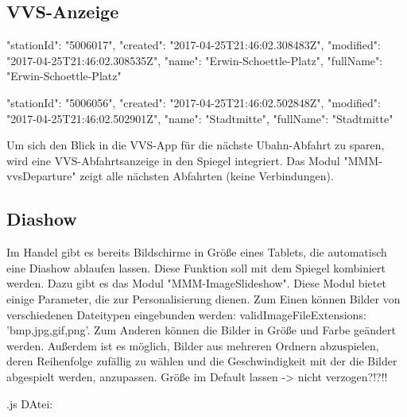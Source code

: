 \documentclass[12pt,a4paper]{report}
\begin{document}
\subsection{VVS-Anzeige}
"stationId": "5006017",
"created": "2017-04-25T21:46:02.308483Z",
"modified": "2017-04-25T21:46:02.308535Z",
"name": "Erwin-Schoettle-Platz",
"fullName": "Erwin-Schoettle-Platz"

  "stationId": "5006056",
"created": "2017-04-25T21:46:02.502848Z",
"modified": "2017-04-25T21:46:02.502901Z",
"name": "Stadtmitte",
"fullName": "Stadtmitte"

Um sich den Blick in die VVS-App für die nächste Ubahn-Abfahrt zu sparen, wird eine VVS-Abfahrtsanzeige in den Spiegel integriert. Das Modul "MMM-vvsDeparture" zeigt alle nächsten Abfahrten (keine Verbindungen). 
\subsection{Diashow}
Im Handel gibt es bereits Bildschirme in Größe eines Tablets, die automatisch eine Diashow ablaufen lassen. Diese Funktion soll mit dem Spiegel kombiniert werden. Dazu gibt es das Modul "MMM-ImageSlideshow". 
Diese Modul bietet einige Parameter, die zur Personalisierung dienen. 
Zum Einen können Bilder von verschiedenen Dateitypen eingebunden werden: validImageFileExtensions: 'bmp,jpg,gif,png'. Zum Anderen können die Bilder in Größe und Farbe geändert werden. Außerdem ist es möglich, Bilder aus mehreren Ordnern abzuspielen, deren Reihenfolge zufällig zu wählen und die Geschwindigkeit mit der die Bilder abgespielt werden, anzupassen. 
Größe im Default lassen -> nicht verzogen?!?!!



.js DAtei:
\end{document}
